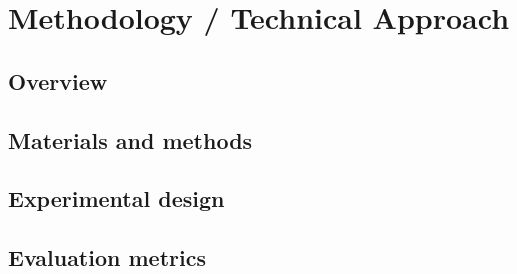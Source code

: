 \chapter{Methodology / Technical Approach}
\label{chap:methodology}


\section{Overview}

\section{Materials and methods}

\section{Experimental design}

\section{Evaluation metrics}
